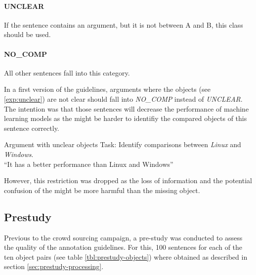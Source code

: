 \paragraph{UNCLEAR} If the sentence contains an argument, but it is not between A and B, this class should be used.




\paragraph{NO\_COMP} All other sentences fall into this category.
\newline

In a first version of the guidelines, arguments where the objects (see \ref{exp:unclear}) are not clear should fall into \emph{NO\_COMP} instead of \emph{UNCLEAR}. The intention was that those sentences will decrease the performance of machine learning models as the might be harder to identifiy the compared objects of this sentence correctly.

\begin{ebox}{Argument with unclear objects}
\label{exp:unclear}
Task: Identify comparisons between \emph{Linux} and \emph{Windows}.\\
\enquote{It has a better performance than Linux and Windows}
\end{ebox}

However, this restriction was dropped as the loss of information and the potential confusion of the might be more harmful than the missing object.


\label{sec:annotation-guidelines}
\subsection{Prestudy}
Previous to the crowd sourcing campaign, a pre-study was conducted to assess the quality of the annotation guidelines. For this, 100 sentences for each of the ten object pairs (see table \ref{tbl:prestudy-objects}) where obtained as described in section \ref{sec:prestudy-processing}.

